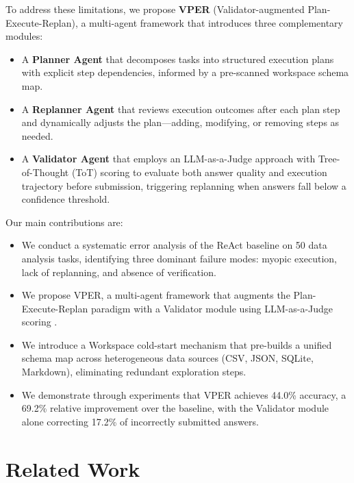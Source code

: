\documentclass{article}
\begin{document}
To address these limitations, we propose \textbf{VPER} (Validator-augmented Plan-Execute-Replan), a multi-agent framework that introduces three complementary modules:

\begin{itemize}[leftmargin=*]
    \item A \textbf{Planner Agent} that decomposes tasks into structured execution plans with explicit step dependencies, informed by a pre-scanned workspace schema map.
    \item A \textbf{Replanner Agent} that reviews execution outcomes after each plan step and dynamically adjusts the plan---adding, modifying, or removing steps as needed.
    \item A \textbf{Validator Agent} that employs an LLM-as-a-Judge approach with Tree-of-Thought (ToT) scoring \cite{yao2023tree} to evaluate both answer quality and execution trajectory before submission, triggering replanning when answers fall below a confidence threshold.
\end{itemize}

Our main contributions are:
\begin{itemize}[leftmargin=*]
    \item We conduct a systematic error analysis of the ReAct baseline on 50 data analysis tasks, identifying three dominant failure modes: myopic execution, lack of replanning, and absence of verification.
    \item We propose VPER, a multi-agent framework that augments the Plan-Execute-Replan paradigm with a Validator module using LLM-as-a-Judge scoring \cite{gu2024survey}.
    \item We introduce a Workspace cold-start mechanism that pre-builds a unified schema map across heterogeneous data sources (CSV, JSON, SQLite, Markdown), eliminating redundant exploration steps.
    \item We demonstrate through experiments that VPER achieves 44.0\% accuracy, a 69.2\% relative improvement over the baseline, with the Validator module alone correcting 17.2\% of incorrectly submitted answers.
\end{itemize}


\section{Related Work}
\end{document}
